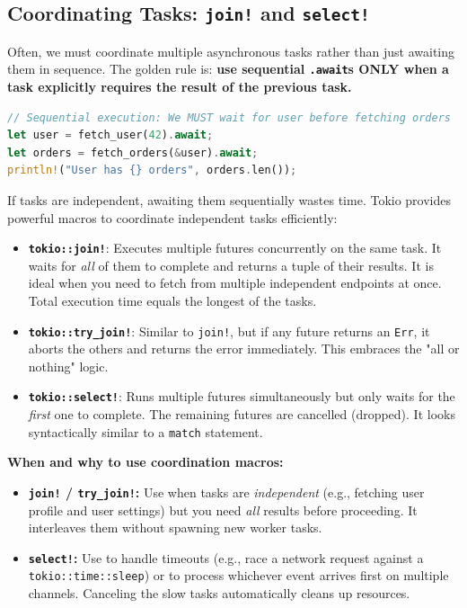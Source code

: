 \subsection{Coordinating Tasks: \texttt{join!} and \texttt{select!}}

Often, we must coordinate multiple asynchronous tasks rather than just awaiting them in sequence. The golden rule is: \textbf{use sequential \texttt{.await}s ONLY when a task explicitly requires the result of the previous task.}

\begin{lstlisting}[language=Rust]
// Sequential execution: We MUST wait for user before fetching orders
let user = fetch_user(42).await;
let orders = fetch_orders(&user).await; 
println!("User has {} orders", orders.len());
\end{lstlisting}

If tasks are independent, awaiting them sequentially wastes time. Tokio provides powerful macros to coordinate independent tasks efficiently:

\begin{itemize}
    \item \textbf{\texttt{tokio::join!}}: Executes multiple futures concurrently on the same task. It waits for \textit{all} of them to complete and returns a tuple of their results. It is ideal when you need to fetch from multiple independent endpoints at once. Total execution time equals the longest of the tasks.
    \item \textbf{\texttt{tokio::try\_join!}}: Similar to \texttt{join!}, but if any future returns an \texttt{Err}, it aborts the others and returns the error immediately. This embraces the "all or nothing" logic.
    \item \textbf{\texttt{tokio::select!}}: Runs multiple futures simultaneously but only waits for the \textit{first} one to complete. The remaining futures are cancelled (dropped). It looks syntactically similar to a \texttt{match} statement.
\end{itemize}

\begin{usagebox}
\textbf{When and why to use coordination macros:}
\begin{itemize}
    \item \textbf{\texttt{join!} / \texttt{try\_join!}:} Use when tasks are \textit{independent} (e.g., fetching user profile and user settings) but you need \textit{all} results before proceeding. It interleaves them without spawning new worker tasks.
    \item \textbf{\texttt{select!}:} Use to handle timeouts (e.g., race a network request against a \texttt{tokio::time::sleep}) or to process whichever event arrives first on multiple channels. Canceling the slow tasks automatically cleans up resources.
\end{itemize}
\end{usagebox}

